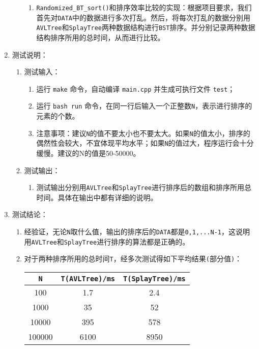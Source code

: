 \documentclass[a4paper,12pt]{article}
\begin{document}
\begin{enumerate}
\begin{enumerate}
\begin{enumerate}
        \item {\hei \verb|Randomized_BT_sort()|和排序效率比较的实现}：根据项目要求，我们首先对\verb|DATA|中的数据进行多次打乱。然后，将每次打乱的数据分别用\verb|AVLTree|和\verb|SplayTree|两种数据结构进行\verb|BST|排序。并分别记录两种数据结构排序所用的总时间，从而进行比较。
    \end{enumerate}
\end{enumerate}
\item 测试说明：
\begin{enumerate}
    \item 测试输入：
    \begin{enumerate}
        \item 运行 \verb|make| 命令，自动编译 \verb|main.cpp| 并生成可执行文件 \verb|test|；
        \item 运行 \verb|bash run| 命令，{\hei 在同一行后输入一个正整数\verb|N|，表示进行排序的元素的个数}。
        \item {\hei 注意事项：建议\verb|N|的值不要太小也不要太大}。如果\verb|N|的值太小，排序的偶然性会较大，不宜体现平均水平；如果\verb|N|的值过大，程序运行会十分缓慢。{\hei 建议的N的值是50-50000。}
    \end{enumerate}
    \item 测试输出：
        \begin{enumerate}
        \item 测试输出分别用\verb|AVLTree|和\verb|SplayTree|进行排序后的数组和排序所用总时间。具体在输出中都有详细的说明。
    \end{enumerate}
\end{enumerate}
\item 测试结论：
\begin{enumerate}
     \item 经验证，无论\verb|N|取什么值，输出的排序后的\verb|DATA|都是\verb|0,1,...N-1|，这说明{\hei 用\verb|AVLTree|和\verb|SplayTree|进行排序的算法都是正确的}。
     \item 对于两种排序所用的总时间\verb|T|，经多次测试得如下平均结果\verb|(|部分值\verb|)|：
     
     \begin{center}
     \begin{tabular}{|c|c|c|}
     \hline
        \verb|N|  & \verb|T(AVLTree)/ms| & \verb|T(SplayTree)/ms|\\
     \hline
     100  & 1.7 & 2.4 \\
     \hline
     1000 & 35 & 52 \\
     \hline
     10000 & 395 & 578 \\
     \hline
     100000 & 6100 & 8950 \\
     \hline
     \end{tabular}
     \end{center}


\end{enumerate}
\end{enumerate}
\end{document}
